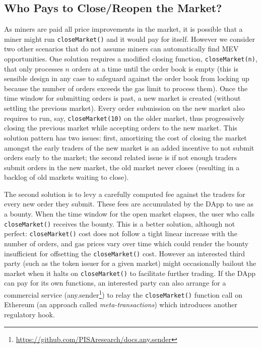 \subsection{Who Pays to Close/Reopen the Market?}
\label{sec:close}

As miners are paid all price improvements in the market, it is possible that a miner might run \texttt{closeMarket()} and it would pay for itself. However we consider two other scenarios that do not assume miners can automatically find MEV opportunities. One solution requires a modified closing function, \texttt{closeMarket(n)}, that only processes $n$ orders at a time until the order book is empty (this is sensible design in any case to safeguard against the order book from locking up because the number of orders exceeds the gas limit to process them).  Once the time window for submitting orders is past, a new market is created (without settling the previous market). Every order submission on the new market also requires to run, say, \texttt{closeMarket(10)} on the older market, thus progressively closing the previous market while accepting orders to the new market. This solution pattern has two issues: first, amortizing the cost of closing the market amongst the early traders of the new market is an added incentive to not submit orders early to the market; the second related issue is if not enough traders submit orders in the new market, the old market never closes (resulting in a backlog of old markets waiting to close).

The second solution is to levy a carefully computed fee against the traders for every new order they submit. These fees are accumulated by the DApp to use as a bounty. When the time window for the open market elapses, the user who calls \texttt{closeMarket()} receives the bounty. This is a better solution, although not perfect: \texttt{closeMarket()} cost does not follow a tight linear increase with the number of orders, and gas prices vary over time which could render the bounty insufficient for offsetting the \texttt{closeMarket()} cost. However an interested third party (such as the token issuer for a given market) might occasionally bailout the market when it halts on \texttt{closeMarket()} to facilitate further trading. If the DApp can pay for its own functions, an interested party can also arrange for a commercial service (\eg any.sender\footnote{\url{https://github.com/PISAresearch/docs.any.sender}}) to relay the \texttt{closeMarket()} function call on Ethereum (an approach called \textit{meta-transactions}) which introduces another regulatory hook.

